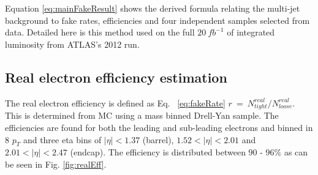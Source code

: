 Equation \ref{eq:mainFakeResult} shows the derived formula relating the multi-jet background to fake rates, efficiencies and four independent samples selected from data. Detailed here is this method used on the full $20~fb^{-1}$ of integrated luminosity from ATLAS's 2012 run.


\subsection{Real electron efficiency estimation}

The real electron efficiency is defined as Eq. ~\ref{eq:fakeRate} $r~=~N^{real}_{tight}/N^{real}_{loose}$. This is determined from MC using a mass binned Drell-Yan sample. The efficiencies are found for both the leading and sub-leading electrons and binned in 8 $p_{T}$ and three eta bins of $|\eta|<1.37$ (barrel), $1.52<|\eta|<2.01$ and $2.01<|\eta|<2.47$ (endcap). The efficiency is distributed between $90$ - $96\%$ as can be seen in Fig. \ref{fig:realEff}.

